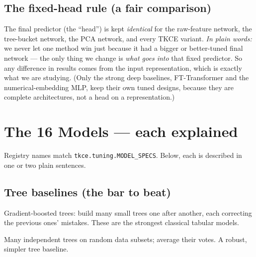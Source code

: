 \documentclass[11pt]{article}
\newcommand{\code}[1]{\texttt{#1}}
\begin{document}
\subsection{The fixed-head rule (a fair comparison)}
The final predictor (the ``head'') is kept \emph{identical} for the raw-feature
network, the tree-bucket network, the PCA network, and every TKCE variant.
\textit{In plain words:} we never let one method win just because it had a bigger
or better-tuned final network --- the only thing we change is \emph{what goes into}
that fixed predictor. So any difference in results comes from the input
representation, which is exactly what we are studying. (Only the strong deep
baselines, FT-Transformer and the numerical-embedding MLP, keep their own tuned
designs, because they are complete architectures, not a head on a representation.)

\section{The 16 Models --- each explained}
Registry names match \code{tkce.tuning.MODEL\_SPECS}. Below, each is described in
one or two plain sentences.

\subsection{Tree baselines (the bar to beat)}
\begin{description}[leftmargin=2.2em,style=nextline,itemsep=2pt]
  \item[\code{xgboost}, \code{lightgbm}, \code{catboost}] Gradient-boosted trees:
  build many small trees one after another, each correcting the previous ones'
  mistakes. These are the strongest classical tabular models.
  \item[\code{random\_forest}] Many independent trees on random data subsets;
  average their votes. A robust, simpler tree baseline.
\end{description}
\end{document}
